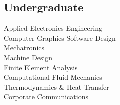 \documentclass[]{deedy-resume-openfont}
\begin{document}
\begin{minipage}[t]{0.33\textwidth}
\sectionsep{}

\subsection{Undergraduate}
Applied Electronics Engineering\\
Computer Graphics Software Design \\
Mechatronics \\
Machine Design \\
Finite Element Analysis\\
Computational Fluid Mechanics\\
Thermodynamics \& Heat Transfer\\
Corporate Communications\\
\sectionsep


%
%

\end{minipage} 
\hfill
\end{document}
